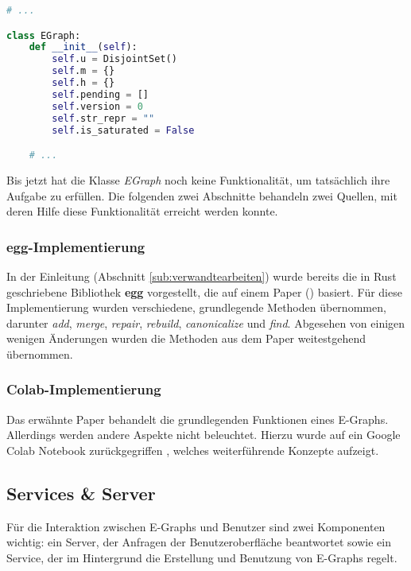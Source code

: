 \begin{lstlisting}[language=Python, caption=Klasse \textit{EGraph}]
# ... 

class EGraph:
    def __init__(self):
        self.u = DisjointSet()
        self.m = {}
        self.h = {}
        self.pending = []
        self.version = 0
        self.str_repr = ""
        self.is_saturated = False

    # ...
\end{lstlisting} 

Bis jetzt hat die Klasse \textit{EGraph} noch keine Funktionalität, um tatsächlich ihre Aufgabe zu erfüllen. Die folgenden zwei Abschnitte 
behandeln zwei Quellen, mit deren Hilfe diese Funktionalität erreicht werden konnte.

\subsubsection{egg-Implementierung}\label{subsub:egg}

In der Einleitung (Abschnitt \ref{sub:verwandtearbeiten}) wurde bereits die in Rust geschriebene Bibliothek \textbf{egg} vorgestellt, die auf einem Paper (\cite{2021-egg}) basiert.
Für diese Implementierung wurden verschiedene, grundlegende Methoden übernommen, darunter \textit{add}, \textit{merge}, \textit{repair}, \textit{rebuild}, \textit{canonicalize} und
\textit{find}. Abgesehen von einigen wenigen Änderungen wurden die Methoden aus dem Paper weitestgehend übernommen.



\subsubsection{Colab-Implementierung}\label{subsub:colab}

Das erwähnte Paper behandelt die grundlegenden Funktionen eines E-Graphs. Allerdings werden andere Aspekte nicht beleuchtet. Hierzu wurde auf ein Google Colab Notebook zurückgegriffen \cite{devito},
welches weiterführende Konzepte aufzeigt.







\subsection{Services \& Server}

Für die Interaktion zwischen E-Graphs und Benutzer sind zwei Komponenten wichtig: ein Server, der Anfragen der Benutzeroberfläche beantwortet sowie ein Service, der im Hintergrund
die Erstellung und Benutzung von E-Graphs regelt.

